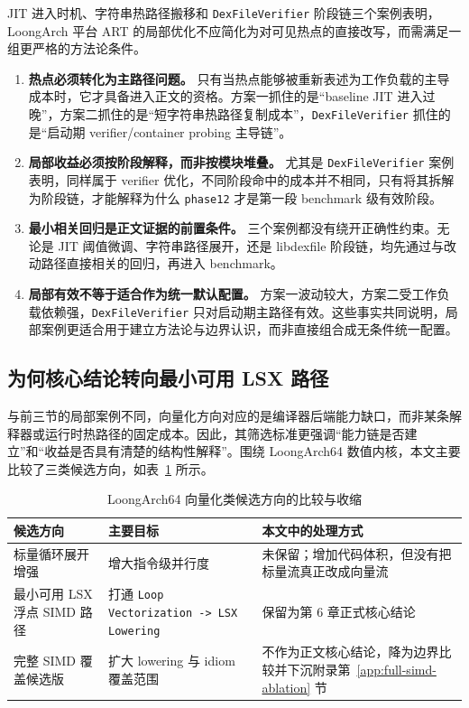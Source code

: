 JIT 进入时机、字符串热路径搬移和 \texttt{DexFileVerifier} 阶段链三个案例表明，LoongArch 平台 ART 的局部优化不应简化为对可见热点的直接改写，而需满足一组更严格的方法论条件。

\begin{enumerate}
    \item \textbf{热点必须转化为主路径问题。} 只有当热点能够被重新表述为工作负载的主导成本时，它才具备进入正文的资格。方案一抓住的是“baseline JIT 进入过晚”，方案二抓住的是“短字符串热路径复制成本”，\texttt{DexFileVerifier} 抓住的是“启动期 verifier/container probing 主导链”。
    \item \textbf{局部收益必须按阶段解释，而非按模块堆叠。} 尤其是 \texttt{DexFileVerifier} 案例表明，同样属于 verifier 优化，不同阶段命中的成本并不相同，只有将其拆解为阶段链，才能解释为什么 \texttt{phase12} 才是第一段 benchmark 级有效阶段。
    \item \textbf{最小相关回归是正文证据的前置条件。} 三个案例都没有绕开正确性约束。无论是 JIT 阈值微调、字符串路径展开，还是 libdexfile 阶段链，均先通过与改动路径直接相关的回归，再进入 benchmark。
    \item \textbf{局部有效不等于适合作为统一默认配置。} 方案一波动较大，方案二受工作负载依赖强，\texttt{DexFileVerifier} 只对启动期主路径有效。这些事实共同说明，局部案例更适合用于建立方法论与边界认识，而非直接组合成无条件统一配置。
\end{enumerate}

\subsection{为何核心结论转向最小可用 LSX 路径}

与前三节的局部案例不同，向量化方向对应的是编译器后端能力缺口，而非某条解释器或运行时热路径的固定成本。因此，其筛选标准更强调“能力链是否建立”和“收益是否具有清楚的结构性解释”。围绕 LoongArch64 数值内核，本文主要比较了三类候选方向，如表~\ref{tab:vectorization-candidates} 所示。

\begin{table}[htbp]
    \centering
    \small
    \caption{LoongArch64 向量化类候选方向的比较与收缩}
    \label{tab:vectorization-candidates}
    \begin{tabular}{>{\raggedright\arraybackslash}p{3.6cm}>{\raggedright\arraybackslash}p{3.2cm}>{\raggedright\arraybackslash}p{4.7cm}}
        \hline
        \textbf{候选方向} & \textbf{主要目标} & \textbf{本文中的处理方式} \\
        \hline
        标量循环展开增强 & 增大指令级并行度 & 未保留；增加代码体积，但没有把标量流真正改成向量流 \\
        最小可用 LSX 浮点 SIMD 路径 & 打通 \texttt{Loop Vectorization -> LSX Lowering} & 保留为第 6 章正式核心结论 \\
        完整 SIMD 覆盖候选版 & 扩大 lowering 与 idiom 覆盖范围 & 不作为正文核心结论，降为边界比较并下沉附录第~\ref{app:full-simd-ablation} 节 \\
        \hline
    \end{tabular}
\end{table}

